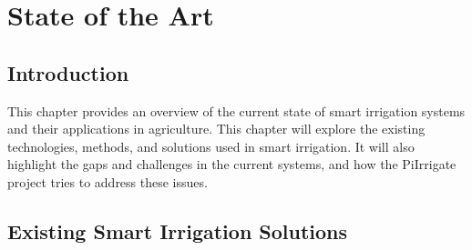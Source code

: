\chapter{State of the Art}\label{section:stateoftheart}

\section{Introduction}
This chapter provides an overview of the current state of smart irrigation 
systems and their applications in agriculture. 
This chapter will explore the existing technologies, methods, and solutions used in smart irrigation. 
It will also highlight the gaps and challenges in the current systems,
and how the PiIrrigate project tries to address these issues.

\section{Existing Smart Irrigation Solutions}
